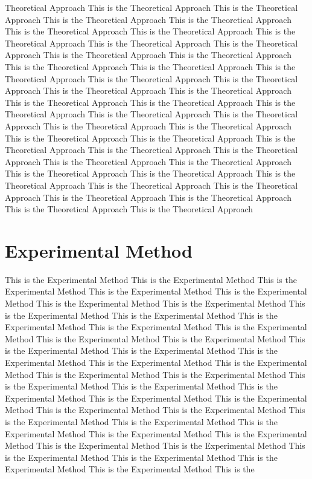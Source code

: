 \documentclass[twocolumn,a4paper,10pt]{article}
\begin{document}
Theoretical Approach This is the Theoretical Approach This is the Theoretical Approach This is the Theoretical Approach This is the Theoretical Approach This is the Theoretical Approach This is the Theoretical Approach This is the Theoretical Approach This is the Theoretical Approach This is the Theoretical Approach This is the Theoretical Approach This is the Theoretical Approach This is the Theoretical Approach This is the Theoretical Approach This is the Theoretical Approach This is the Theoretical Approach This is the Theoretical Approach This is the Theoretical Approach This is the Theoretical Approach This is the Theoretical Approach This is the Theoretical Approach This is the Theoretical Approach This is the Theoretical Approach This is the Theoretical Approach This is the Theoretical Approach This is the Theoretical Approach This is the Theoretical Approach This is the Theoretical Approach This is the Theoretical Approach This is the Theoretical Approach This is the Theoretical Approach This is the Theoretical Approach This is the Theoretical Approach This is the Theoretical Approach This is the Theoretical Approach This is the Theoretical Approach This is the Theoretical Approach This is the Theoretical Approach This is the Theoretical Approach This is the Theoretical Approach This is the Theoretical Approach This is the Theoretical Approach



\section{Experimental Method}
This is the Experimental Method This is the Experimental Method This is the Experimental Method This is the Experimental Method This is the Experimental Method This is the Experimental Method This is the Experimental Method This is the Experimental Method This is the Experimental Method This is the Experimental Method This is the Experimental Method This is the Experimental Method This is the Experimental Method This is the Experimental Method This is the Experimental Method This is the Experimental Method This is the Experimental Method This is the Experimental Method This is the Experimental Method This is the Experimental Method This is the Experimental Method This is the Experimental Method This is the Experimental Method This is the Experimental Method This is the Experimental Method This is the Experimental Method This is the Experimental Method This is the Experimental Method This is the Experimental Method This is the Experimental Method This is the Experimental Method This is the Experimental Method This is the Experimental Method This is the Experimental Method This is the Experimental Method This is the Experimental Method This is the Experimental Method This is the Experimental Method This is the Experimental Method This is the 
\end{document}
